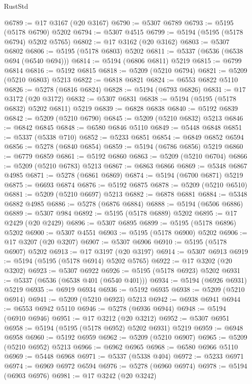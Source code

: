 \begin{lexlean}{RustStd}
\begin{coremodule}
@6789 := @17 @3167 (@20 @3167)
@6790 := @5307 @6789
@6793 := @5195 (@5178 @6790) @5202
@6794 := @5307 @4515
@6799 := @5194 (@5195 (@5178 @6794) @5202 @5765)
@6802 := @17 @3162 (@20 @3162)
@6803 := @5307 @6802
@6806 := @5195 (@5178 @6803) @5202
@6811 := @5337 (@6536 (@6538 @694 (@6540 @694)))
@6814 := @5194 (@6806 @6811) @5219
@6815 := @6799 @6814
@6816 := @5192 @6815
@6818 := @5209 (@5210 @6794)
@6821 := @5209 (@5210 @6803) @5213
@6822 := @6818 @6821
@6824 := @6553 @6822 @5110
@6826 := @5278 (@6816 @6824)
@6828 := @5194 (@6793 @6826)
@6831 := @17 @3172 (@20 @3172)
@6832 := @5307 @6831
@6838 := @5194 (@5195 (@5178 @6832) @5202 @6811) @5219
@6839 := @6828 @6838
@6840 := @5192 @6839
@6842 := @5209 (@5210 @6790)
@6845 := @5209 (@5210 @6832) @5213
@6846 := @6842 @6845
@6848 := @6580 @6846 @5110
@6849 := @5448 @6848
@6851 := @5337 (@5338 @710)
@6852 := @5233 @6851
@6854 := @6849 @6852 @6594
@6856 := @5278 (@6840 @6854)
@6859 := @5194 (@6786 @6856) @5219
@6860 := @6779 @6859
@6861 := @5192 @6860
@6863 := @5209 (@5210 @6704)
@6866 := @5209 (@5210 @6783) @5213
@6867 := @6863 @6866
@6869 := @5348 @6867 @4985
@6871 := @5278 (@6861 @6869)
@6874 := @5194 (@6700 @6871) @5219
@6875 := @6693 @6874
@6876 := @5192 @6875
@6878 := @5209 (@5210 @6510)
@6881 := @5209 (@5210 @6697) @5213
@6882 := @6878 @6881
@6884 := @5348 @6882 @4985
@6886 := @5278 (@6876 @6884)
@6888 := @5194 (@6506 @6886)
@6889 := @5307 @984
@6892 := @5195 (@5178 @6889) @5202
@6895 := @17 @2429 (@20 @2429)
@6896 := @5307 @6895
@6899 := @5195 (@5178 @6896) @5202
@6900 := @5307 @4551
@6903 := @5195 (@5178 @6900) @5202
@6906 := @17 @3207 (@20 @3207)
@6907 := @5307 @6906
@6910 := @5195 (@5178 @6907) @5202
@6913 := @17 @3197 (@20 @3197)
@6914 := @5307 @6913
@6919 := @5194 (@5195 (@5178 @6914) @5202 @5765)
@6922 := @17 @3202 (@20 @3202)
@6923 := @5307 @6922
@6926 := @5195 (@5178 @6923) @5202
@6931 := @5337 (@6536 (@6538 @401 (@6540 @401)))
@6934 := @5194 (@6926 @6931) @5219
@6935 := @6919 @6934
@6936 := @5192 @6935
@6938 := @5209 (@5210 @6914)
@6941 := @5209 (@5210 @6923) @5213
@6942 := @6938 @6941
@6944 := @6553 @6942 @5110
@6946 := @5278 (@6936 @6944)
@6948 := @5194 (@6910 @6946)
@6951 := @17 @3212 (@20 @3212)
@6952 := @5307 @6951
@6958 := @5194 (@5195 (@5178 @6952) @5202 @6931) @5219
@6959 := @6948 @6958
@6960 := @5192 @6959
@6962 := @5209 (@5210 @6907)
@6965 := @5209 (@5210 @6952) @5213
@6966 := @6962 @6965
@6968 := @6580 @6966 @5110
@6969 := @5448 @6968
@6971 := @5337 (@5338 @404)
@6972 := @5233 @6971
@6974 := @6969 @6972 @6594
@6976 := @5278 (@6960 @6974)
@6978 := @5194 (@6903 @6976)
@6981 := @17 @3242 (@20 @3242)

\end{coremodule}
\end{lexlean}
